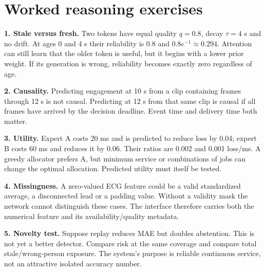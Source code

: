 \documentclass[10pt,a4paper]{article}
\begin{document}
\section{Worked reasoning exercises}
\textbf{1. Stale versus fresh.} Two tokens have equal quality $q=0.8$, decay $\tau=4$ s and no drift. At ages 0 and 4 s their reliability is $0.8$ and $0.8e^{-1}\approx0.294$. Attention can still learn that the older token is useful, but it begins with a lower prior weight. If its generation is wrong, reliability becomes exactly zero regardless of age.

\textbf{2. Causality.} Predicting engagement at 10 s from a clip containing frames through 12 s is not causal. Predicting at 12 s from that same clip is causal if all frames have arrived by the decision deadline. Event time and delivery time both matter.

\textbf{3. Utility.} Expert A costs 20 ms and is predicted to reduce loss by 0.04; expert B costs 60 ms and reduces it by 0.06. Their ratios are 0.002 and 0.001 loss/ms. A greedy allocator prefers A, but minimum service or combinations of jobs can change the optimal allocation. Predicted utility must itself be tested.

\textbf{4. Missingness.} A zero-valued ECG feature could be a valid standardized average, a disconnected lead or a padding value. Without a validity mask the network cannot distinguish these cases. The interface therefore carries both the numerical feature and its availability/quality metadata.

\textbf{5. Novelty test.} Suppose replay reduces MAE but doubles abstention. This is not yet a better detector. Compare risk at the same coverage and compare total stale/wrong-person exposure. The system's purpose is reliable continuous service, not an attractive isolated accuracy number.
\end{document}
